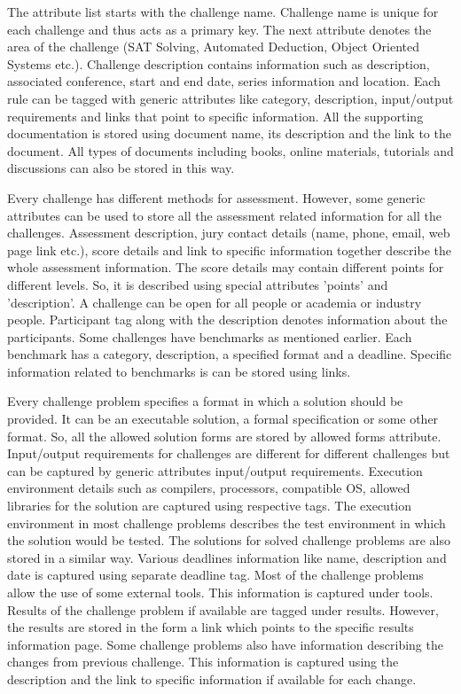 \documentclass[11pt,letterpaper]{report}
\begin{document}
The attribute list starts with the challenge name. Challenge name is unique for each challenge and thus acts as a primary key. The next attribute denotes the area of the challenge (SAT Solving, Automated Deduction, Object Oriented Systems etc.). Challenge description contains information such as description, associated conference, start and end date, series information and location. Each rule can be tagged with generic attributes like category, description, input/output requirements and links that point to specific information. All the supporting documentation is stored using document name, its description and the link to the document. All types of documents including books, online materials, tutorials and discussions can also be stored in this way. 

Every challenge has different methods for assessment. However, some generic attributes can be used to store all the assessment related information for all the challenges. Assessment description, jury contact details (name, phone, email, web page link etc.), score details and link to specific information together describe the whole assessment information. The score details may contain different points for different levels. So, it is described using special attributes 'points' and 'description'. A challenge can be open for all people or academia or industry people. Participant tag along with the description denotes information about the participants. Some challenges have benchmarks as mentioned earlier. Each benchmark has a category, description, a specified format and a deadline. Specific information related to benchmarks is can be stored using links.

Every challenge problem specifies a format in which a solution should be provided. It can be an executable solution, a formal specification or some other format. So, all the allowed solution forms are stored by allowed forms attribute. Input/output requirements for challenges are different for different challenges but can be captured by generic attributes input/output requirements. Execution environment details such as compilers, processors, compatible OS, allowed libraries for the solution are captured using respective tags. The execution environment in most challenge problems describes the test environment in which the solution would be tested.  The solutions for solved challenge problems are also stored in a similar way. Various deadlines information like name, description and date is captured using separate deadline tag. Most of the challenge problems allow the use of some external tools. This information is captured under tools. Results of the challenge problem if available are tagged under results. However, the results are stored in the form a link which points to the specific results information page. Some challenge problems also have information describing the changes from previous challenge. This information is captured using the description and the link to specific information if available for each change.    
\end{document}
